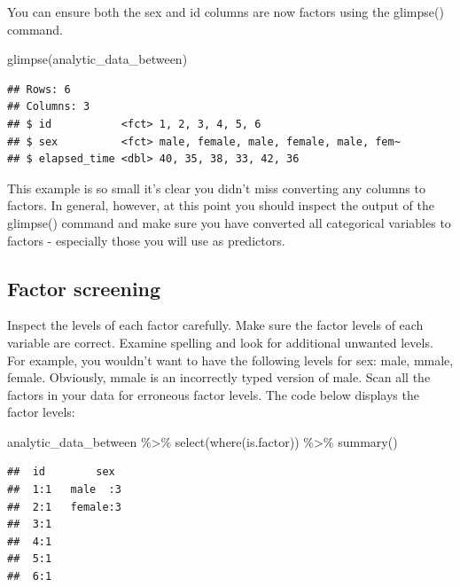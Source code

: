 \documentclass[
]{krantz}
\makeatletter
\newenvironment{Shaded}{\begin{snugshade}}{\end{snugshade}}
\newcommand{\FunctionTok}[1]{\textcolor[rgb]{0,0,0}{#1}}
\newcommand{\NormalTok}[1]{#1}
\newcommand{\SpecialCharTok}[1]{\textcolor[rgb]{0,0,0}{#1}}
\newenvironment{kframe}{%
\medskip{}
\setlength{\fboxsep}{.8em}
 \def\at@end@of@kframe{}%
 \ifinner\ifhmode%
  \def\at@end@of@kframe{\end{minipage}}%
  \begin{minipage}{\columnwidth}%
 \fi\fi%
 \def\FrameCommand##1{\hskip\@totalleftmargin \hskip-\fboxsep
 \colorbox{shadecolor}{##1}\hskip-\fboxsep
     \hskip-\linewidth \hskip-\@totalleftmargin \hskip\columnwidth}%
 \MakeFramed {\advance\hsize-\width
   \@totalleftmargin\z@ \linewidth\hsize
   \@setminipage}}%
 {\par\unskip\endMakeFramed%
 \at@end@of@kframe}
\renewenvironment{Shaded}{\begin{kframe}}{\end{kframe}}
\makeatother
\begin{document}
You can ensure both the sex and id columns are now factors using the glimpse() command.

\begin{Shaded}
\begin{Highlighting}[]
\FunctionTok{glimpse}\NormalTok{(analytic\_data\_between)}
\end{Highlighting}
\end{Shaded}

\begin{verbatim}
## Rows: 6
## Columns: 3
## $ id           <fct> 1, 2, 3, 4, 5, 6
## $ sex          <fct> male, female, male, female, male, fem~
## $ elapsed_time <dbl> 40, 35, 38, 33, 42, 36
\end{verbatim}

This example is so small it's clear you didn't miss converting any columns to factors. In general, however, at this point you should inspect the output of the glimpse() command and make sure you have converted all categorical variables to factors - especially those you will use as predictors.

\hypertarget{factor-screening-2}{%
\subsection{Factor screening}\label{factor-screening-2}}

Inspect the levels of each factor carefully. Make sure the factor levels of each variable are correct. Examine spelling and look for additional unwanted levels. For example, you wouldn't want to have the following levels for sex: male, mmale, female. Obviously, mmale is an incorrectly typed version of male. Scan all the factors in your data for erroneous factor levels. The code below displays the factor levels:

\begin{Shaded}
\begin{Highlighting}[]
\NormalTok{analytic\_data\_between }\SpecialCharTok{\%\textgreater{}\%}
  \FunctionTok{select}\NormalTok{(}\FunctionTok{where}\NormalTok{(is.factor)) }\SpecialCharTok{\%\textgreater{}\%}
  \FunctionTok{summary}\NormalTok{()}
\end{Highlighting}
\end{Shaded}

\begin{verbatim}
##  id        sex   
##  1:1   male  :3  
##  2:1   female:3  
##  3:1             
##  4:1             
##  5:1             
##  6:1
\end{verbatim}
\end{document}
